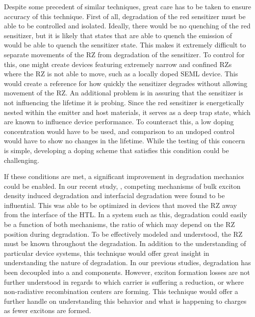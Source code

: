 \documentclass[../thesis.tex]{subfiles}
\begin{document}
Despite some precedent of similar techniques, great care has to be taken to ensure accuracy of this technique.
First of all, degradation of the red sensitizer must be able to be controlled and isolated.
Ideally, there would be no quenching of the red sensitizer, but it is likely that states that are able to quench the emission of \irppy would be able to quench the sensitizer state.
This makes it extremely difficult to separate movements of the RZ from degradation of the sensitizer.
To control for this, one might create devices featuring extremely narrow and confined RZs where the RZ is not able to move, such as a locally doped SEML device.
This would create a reference for how quickly the sensitizer degrades without allowing movement of the RZ.
An additional problem is in assuring that the sensitizer is not influencing the lifetime it is probing.
Since the red sensitizer is energetically nested within the emitter and host materials, it serves as a deep trap state, which are known to influence device performance.
To counteract this, a low doping concentration would have to be used, and comparison to an undoped control would have to show no changes in the lifetime.
While the testing of this concern is simple, developing a doping scheme that satisfies this condition could be challenging.

If these conditions are met, a significant improvement in degradation mechanics could be enabled.
In our recent study, \textcite{Bangsund2018a}, competing mechanisms of bulk exciton density induced degradation and interfacial degradation were found to be influential.
This was able to be optimized in devices that moved the RZ away from the interface of the HTL.
In a system such as this, degradation could easily be a function of both mechanisms, the ratio of which may depend on the RZ position during degradation.
To be effectively modeled and understood, the RZ must be known throughout the degradation.
In addition to the understanding of particular device systems, this technique would offer great insight in understanding the nature of \ef degradation.
In our previous studies,\supercite{Bangsund2018,Bangsund2018a,Hershey2017} degradation has been decoupled into a \pl and \ef components.
However, exciton formation losses are not further understood in regards to which carrier is suffering a reduction, or where non-radiative recombination centers are forming.
This technique would offer a further handle on understanding this behavior and what is happening to charges as fewer excitons are formed.






\end{document}
